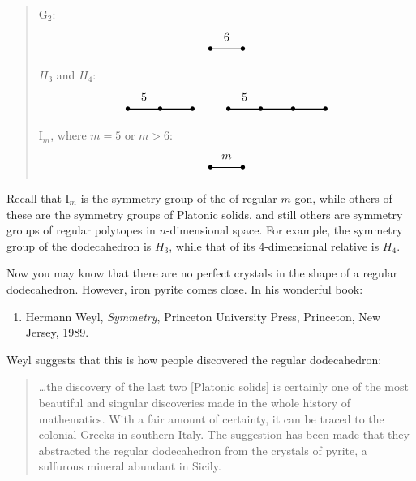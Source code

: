 \documentclass{article}
\def\tightlist{}
\begin{document}
\begin{quote}
\[\] \(\mathrm{G}_2\): \[
  \begin{tikzpicture}
    \draw[thick] (0,0) node{$\bullet$} to node[label=above:{6}]{} (1,0) node{$\bullet$};
  \end{tikzpicture}
\] \(H_3\) and \(H_4\): \[
  \begin{tikzpicture}
    \draw[thick] (0,0) node{$\bullet$} to node[label=above:{5}]{} (1,0) node{$\bullet$} to (2,0) node{$\bullet$};
  \end{tikzpicture}
  \qquad
  \begin{tikzpicture}
  \draw[thick] (0,0) node{$\bullet$} to node[label=above:{5}]{} (1,0) node{$\bullet$} to (2,0) node{$\bullet$} to (3,0) node {$\bullet$};
\end{tikzpicture}
\] \(\mathrm{I}_m\), where \(m = 5\) or \(m > 6\): \[
  \begin{tikzpicture}
    \draw[thick] (0,0) node{$\bullet$} to node[label=above:{$m$}]{} (1,0) node{$\bullet$};
  \end{tikzpicture}
\]
\end{quote}

Recall that \(\mathrm{I}_m\) is the symmetry group of the of regular
\(m\)-gon, while others of these are the symmetry groups of Platonic
solids, and still others are symmetry groups of regular polytopes in
\(n\)-dimensional space. For example, the symmetry group of the
dodecahedron is \(H_3\), while that of its 4-dimensional relative is
\(H_4\).

Now you may know that there are no perfect crystals in the shape of a
regular dodecahedron. However, iron pyrite comes close. In his wonderful
book:

\begin{enumerate}
\def\labelenumi{\arabic{enumi})}
\tightlist
\item
  Hermann Weyl, \emph{Symmetry}, Princeton University Press, Princeton,
  New Jersey, 1989.
\end{enumerate}

Weyl suggests that this is how people discovered the regular
dodecahedron:

\begin{quote}
\ldots the discovery of the last two {[}Platonic solids{]} is certainly
one of the most beautiful and singular discoveries made in the whole
history of mathematics. With a fair amount of certainty, it can be
traced to the colonial Greeks in southern Italy. The suggestion has been
made that they abstracted the regular dodecahedron from the crystals of
pyrite, a sulfurous mineral abundant in Sicily.
\end{quote}
\end{document}
